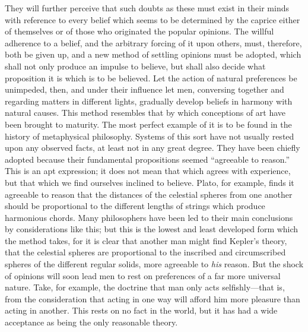 They will further perceive that such doubts as these must exist in
their minds with reference to every belief which seems to be
determined by the caprice either of themselves or of those who
originated the popular opinions. The willful adherence to a belief,
and the arbitrary forcing of it upon others, must, therefore, both be
given up, and a new method of settling opinions must be adopted, which
shall not only produce an impulse to believe, but shall also decide
what proposition it is which is to be believed. Let the action of
natural preferences be unimpeded, then, and under their influence
let men, conversing together and regarding matters in different
lights, gradually develop beliefs in harmony with natural causes. This
method resembles that by which conceptions of art have been brought to
maturity. The most perfect example of it is to be found in the
history of metaphysical philosophy. Systems of this sort have not
usually rested upon any observed facts, at least not in any great
degree. They have been chiefly adopted because their fundamental
propositions seemed ``agreeable to reason.'' This is an apt
expression; it does not mean that which agrees with experience, but
that which we find ourselves inclined to believe. Plato, for example,
finds it agreeable to reason that the distances of the celestial
spheres from one another should be proportional to the different
lengths of strings which produce harmonious chords. Many philosophers
have been led to their main conclusions by considerations like this;
but this is the lowest and least developed form which the method
takes, for it is clear that another man might find Kepler's theory,
that the celestial spheres are proportional to the inscribed and
circumscribed spheres of the different regular solids, more agreeable
to \textit{his} reason. But the shock of opinions will soon lead men
to rest on preferences of a far more universal nature. Take, for
example, the doctrine that man only acts self\-ish\-ly---that is, from
the consideration that acting in one way will afford him more pleasure
than acting in another. This rests on no fact in the world, but it has
had a wide acceptance as being the only reasonable theory.

